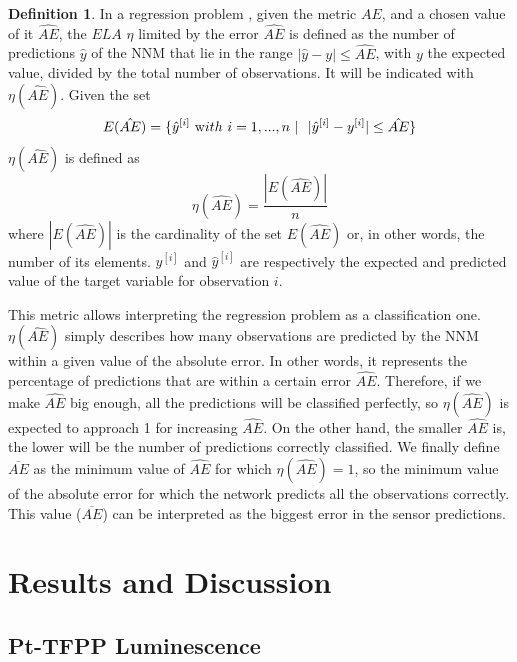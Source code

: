 \documentclass[sensors,article,accept,moreauthors,pdftex,10pt,a4paper]{Definitions/mdpi}
\theoremstyle{definition}
\newtheorem{definition}[theorem]{Definition} %
\begin{document}
\begin{definition}
In a regression problem%
, given the metric $AE$, and a chosen value of it $\hat{AE}$, the $ELA$  $\eta$ limited by the error $\hat{AE}$ is defined as the number of predictions $\hat y$ of the NNM that lie in the range $|\hat y-y|\leq \hat{AE}$, with $y$ the expected value, divided by the total number of observations. It will be indicated with $\eta(\hat{AE})$. Given the set
\begin{equation}
E(\hat{AE}) = \{ \hat y^{[i]} \ {\text with } \ i = 1,..., n\ | \ \ |\hat y^{[i]}-y^{[i]}|\leq \hat{AE} \} 
\end{equation}
$\eta(\hat{AE})$ is defined as
\begin{equation}
\eta(\hat{AE}) = \frac{|E(\hat{AE})|}{n}
\end{equation}
where $|E(\hat{AE})|$ is the cardinality of the set $E(\hat{AE})$ or, in other words, the number of its elements. $ y^{[i]}$ and $\hat y^{[i]}$ are respectively the expected and predicted value of the target variable for observation $i$.
\end{definition}

This metric allows interpreting the regression problem as a classification one. $\eta(\hat{AE})$ simply describes how many observations are predicted by the NNM within a given value of the absolute error. In other words, it represents the percentage of predictions that are within a certain error $\hat{AE}$. Therefore, if we make $\hat{AE}$ big enough, all the predictions will be classified perfectly, so $\eta(\hat{AE})$ is expected to approach 1 for increasing $\hat{AE}$. On the other hand, the smaller $\hat{AE}$ is, the lower will be the number of predictions correctly classified. We finally define $\overline{AE}$ as the minimum value of $\hat{AE}$ for which $\eta(\hat{AE})=1$, so the minimum value of the absolute error for which the network predicts all the observations correctly. This value ($\overline{AE}$) can be interpreted as the biggest error in the sensor predictions.


\section{Results and Discussion}
\label{Results}

\subsection{Pt-TFPP Luminescence}
\end{document}
